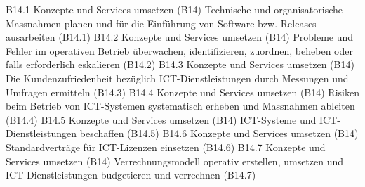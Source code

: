 \templateCard
  {B14.1}
  {Konzepte und Services umsetzen (B14)}
  {Technische und organisatorische Massnahmen planen und für die Einführung von Software bzw. Releases ausarbeiten (B14.1)}
\templateCard
  {B14.2}
  {Konzepte und Services umsetzen (B14)}
  {Probleme und Fehler im operativen Betrieb überwachen, identifizieren, zuordnen, beheben oder falls erforderlich eskalieren (B14.2)}
\templateCard
  {B14.3}
  {Konzepte und Services umsetzen (B14)}
  {Die Kundenzufriedenheit bezüglich ICT-Dienstleistungen durch Messungen und Umfragen ermitteln (B14.3)}
\templateCard
  {B14.4}
  {Konzepte und Services umsetzen (B14)}
  {Risiken beim Betrieb von ICT-Systemen systematisch erheben und Massnahmen ableiten (B14.4)}
\templateCard
  {B14.5}
  {Konzepte und Services umsetzen (B14)}
  {ICT-Systeme und ICT-Dienstleistungen beschaffen (B14.5)}
\templateCard
  {B14.6}
  {Konzepte und Services umsetzen (B14)}
  {Standardverträge für ICT-Lizenzen einsetzen (B14.6)}
\templateCard
  {B14.7}
  {Konzepte und Services umsetzen (B14)}
  {Verrechnungsmodell operativ erstellen, umsetzen und ICT-Dienstleistungen budgetieren und verrechnen (B14.7)}
